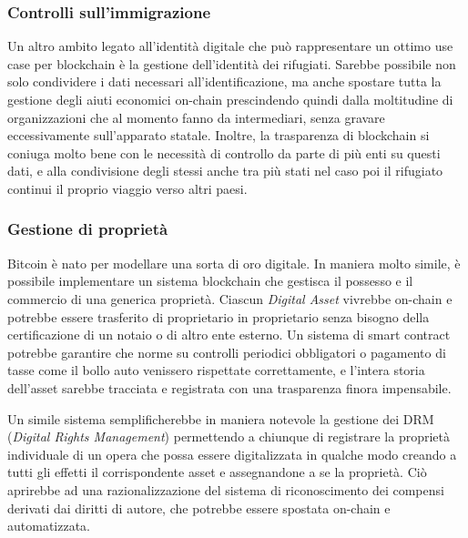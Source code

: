    		\subsubsection{Controlli sull'immigrazione}
   			Un altro ambito legato all'identità digitale che può rappresentare un ottimo use case per blockchain è la gestione dell'identità dei rifugiati. Sarebbe possibile non solo condividere i dati necessari all'identificazione, ma anche spostare tutta la gestione degli aiuti economici on-chain prescindendo quindi dalla moltitudine di organizzazioni che al momento fanno da intermediari, senza gravare eccessivamente sull'apparato statale. Inoltre, la trasparenza di blockchain si coniuga molto bene con le necessità di controllo da parte di più enti su questi dati, e alla condivisione degli stessi anche tra più stati nel caso poi il rifugiato continui il proprio viaggio verso altri paesi.
   			
   		\subsubsection{Gestione di proprietà}
   			Bitcoin è nato per modellare una sorta di oro digitale. In maniera molto simile, è possibile implementare un sistema blockchain che gestisca il possesso e il commercio di una generica proprietà. Ciascun \emph{Digital Asset} vivrebbe on-chain e potrebbe essere trasferito di proprietario in proprietario senza bisogno della certificazione di un notaio o di altro ente esterno. Un sistema di smart contract potrebbe garantire che norme su controlli periodici obbligatori o pagamento di tasse come il bollo auto venissero rispettate correttamente, e l'intera storia dell'asset sarebbe tracciata e registrata con una trasparenza finora impensabile.
   			
   			Un simile sistema semplificherebbe in maniera notevole la gestione dei DRM (\emph{Digital Rights Management}) permettendo a chiunque di registrare la proprietà individuale di un opera che possa essere digitalizzata in qualche modo creando a tutti gli effetti il corrispondente asset e assegnandone a se la proprietà. Ciò aprirebbe ad una razionalizzazione del sistema di riconoscimento dei compensi derivati dai diritti di autore, che potrebbe essere spostata on-chain e automatizzata.
